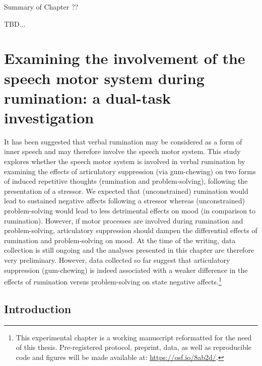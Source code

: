 \documentclass[a4paper,12pt,twoside,openright,oldfontcommands]{memoir}
\let\rmarkdownfootnote\footnote%
\def\footnote{\protect\rmarkdownfootnote}
\newcommand{\initial}[1]{
	\lettrine[lines=3,lhang=0.33,nindent=0em]{
		\color{gray}
     		{\textsc{#1}}}{}}
\newcommand\getcurrentref[1]{
 \ifnumequal{\value{#1}}{0}
  {??}
  {\the\value{#1}}
}
\begin{document}
\newpage

\begin{vplace}[1]

\begin{summary}{Summary of Chapter\getcurrentref{chapter}}

TBD...

\end{summary}

\end{vplace}

\hypertarget{chap7}{%
\chapter{Examining the involvement of the speech motor system during rumination: a dual-task investigation}\label{chap7}}

\initial{I}t has been suggested that verbal rumination may be considered as a form of inner speech and may therefore involve the speech motor system. This study explores whether the speech motor system is involved in verbal rumination by examining the effects of articulatory suppression (via gum-chewing) on two forms of induced repetitive thoughts (rumination and problem-solving), following the presentation of a stressor. We expected that (unconstrained) rumination would lead to sustained negative affects following a stressor whereas (unconstrained) problem-solving would lead to less detrimental effects on mood (in comparison to rumination). However, if motor processes are involved during rumination and problem-solving, articulatory suppression should dampen the differential effects of rumination and problem-solving on mood. At the time of the writing, data collection is still ongoing and the analyses presented in this chapter are therefore very preliminary. However, data collected so far suggest that articulatory suppression (gum-chewing) is indeed associated with a weaker difference in the effects of rumination versus problem-solving on state negative affects.\footnote{This experimental chapter is a working manuscript reformatted for the need of this thesis. Pre-registered protocol, preprint, data, as well as reproducible code and figures will be made available at: \url{https://osf.io/8ab2d/}.}

\hypertarget{introduction-4}{%
\section{Introduction}\label{introduction-4}}
\end{document}
